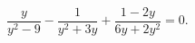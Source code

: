 \begin{ex}[type=equation]
	\begin{condition}
		$\dfrac{y}{y^2 - 9}-\dfrac{1}{y^2  + 3y } + \dfrac{1 - 2y}{6y + 2y^2}  = 0.$
	\end{condition}
\end{ex}
